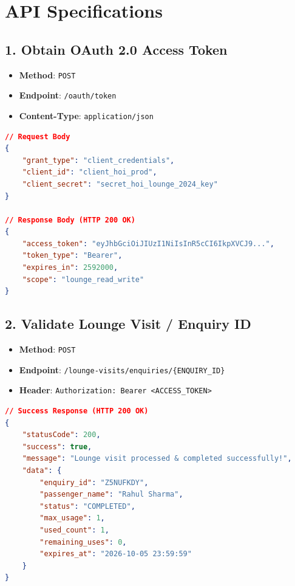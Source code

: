 \documentclass[12pt,a4paper]{article}
\begin{document}
\newpage
\section{API Specifications}

\subsection{1. Obtain OAuth 2.0 Access Token}
\begin{itemize}
    \item \textbf{Method}: \texttt{POST}
    \item \textbf{Endpoint}: \texttt{/oauth/token}
    \item \textbf{Content-Type}: \texttt{application/json}
\end{itemize}

\begin{lstlisting}[language=json, caption={OAuth 2.0 Token Request & Response}]
// Request Body
{
    "grant_type": "client_credentials",
    "client_id": "client_hoi_prod",
    "client_secret": "secret_hoi_lounge_2024_key"
}

// Response Body (HTTP 200 OK)
{
    "access_token": "eyJhbGciOiJIUzI1NiIsInR5cCI6IkpXVCJ9...",
    "token_type": "Bearer",
    "expires_in": 2592000,
    "scope": "lounge_read_write"
}
\end{lstlisting}

\subsection{2. Validate Lounge Visit / Enquiry ID}
\begin{itemize}
    \item \textbf{Method}: \texttt{POST}
    \item \textbf{Endpoint}: \texttt{/lounge-visits/enquiries/\{ENQUIRY\_ID\}}
    \item \textbf{Header}: \texttt{Authorization: Bearer <ACCESS\_TOKEN>}
\end{itemize}

\begin{lstlisting}[language=json, caption={Lounge Visit Validation Response}]
// Success Response (HTTP 200 OK)
{
    "statusCode": 200,
    "success": true,
    "message": "Lounge visit processed & completed successfully!",
    "data": {
        "enquiry_id": "Z5NUFKDY",
        "passenger_name": "Rahul Sharma",
        "status": "COMPLETED",
        "max_usage": 1,
        "used_count": 1,
        "remaining_uses": 0,
        "expires_at": "2026-10-05 23:59:59"
    }
}
\end{lstlisting}
\end{document}
